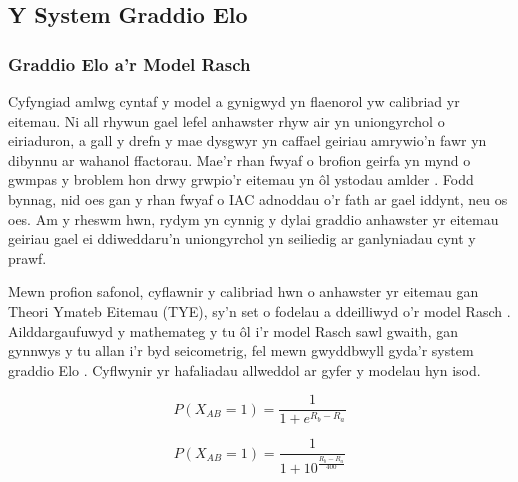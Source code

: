\subsection{Y System Graddio Elo}
\subsubsection{Graddio Elo a'r Model Rasch}
Cyfyngiad amlwg cyntaf y model a gynigwyd yn flaenorol yw calibriad yr eitemau. Ni all rhywun gael lefel anhawster rhyw air yn uniongyrchol o eiriaduron, a gall y drefn y mae dysgwyr yn caffael geiriau amrywio'n fawr yn dibynnu ar wahanol ffactorau. Mae'r rhan fwyaf o brofion geirfa yn mynd o gwmpas y broblem hon drwy grwpio'r eitemau yn ôl ystodau amlder \parencite{nation_teaching_1990, meara_complexities_1994, dudley_context-aligned_2024}. Fodd bynnag, nid oes gan y rhan fwyaf o IAC adnoddau o'r fath ar gael iddynt, neu os oes. Am y rheswm hwn, rydym yn cynnig y dylai graddio anhawster yr eitemau geiriau gael ei ddiweddaru'n uniongyrchol yn seiliedig ar ganlyniadau cynt y prawf.

Mewn profion safonol, cyflawnir y calibriad hwn o anhawster yr eitemau gan Theori Ymateb Eitemau (TYE), sy'n set o fodelau a ddeilliwyd o'r model Rasch \parencite{rasch_probabilistic_1980}. Ailddargaufuwyd y mathemateg y tu ôl i'r model Rasch sawl gwaith, gan gynnwys y tu allan i'r byd seicometrig, fel mewn gwyddbwyll gyda'r system graddio Elo \parencite{elo_uscf_1961, elo_rating_1986}. Cyflwynir yr hafaliadau allweddol ar gyfer y modelau hyn isod.

\begin{figure}[h]
    \centering
    \begin{minipage}{0.45\textwidth}
        \centering
            \[P(X_{AB} = 1)=\frac{1}{1+e^{R_b-R_a}}\]
        \label{eq:rasch}
    \end{minipage}
    \hfill
    \begin{minipage}{0.45\textwidth}
        \centering
            \[P(X_{AB} = 1)=\frac{1}{1+10^{\frac{R_b-R_a}{400}}}\]
        \label{fig:Elo}
    \end{minipage}
\end{figure}

